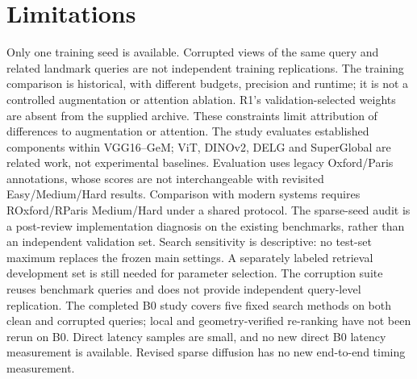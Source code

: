 \section{Limitations}
Only one training seed is available. Corrupted views of the same query and related landmark queries are not independent training replications. The training comparison is historical, with different budgets, precision and runtime; it is not a controlled augmentation or attention ablation. R1's validation-selected weights are absent from the supplied archive. These constraints limit attribution of differences to augmentation or attention. The study evaluates established components within VGG16--GeM; ViT, DINOv2, DELG and SuperGlobal are related work, not experimental baselines. Evaluation uses legacy Oxford/Paris annotations, whose scores are not interchangeable with revisited Easy/Medium/Hard results. Comparison with modern systems requires ROxford/RParis Medium/Hard under a shared protocol. The sparse-seed audit is a post-review implementation diagnosis on the existing benchmarks, rather than an independent validation set. Search sensitivity is descriptive: no test-set maximum replaces the frozen main settings. A separately labeled retrieval development set is still needed for parameter selection. The corruption suite reuses benchmark queries and does not provide independent query-level replication. The completed B0 study covers five fixed search methods on both clean and corrupted queries; local and geometry-verified re-ranking have not been rerun on B0. Direct latency samples are small, and no new direct B0 latency measurement is available. Revised sparse diffusion has no new end-to-end timing measurement.
